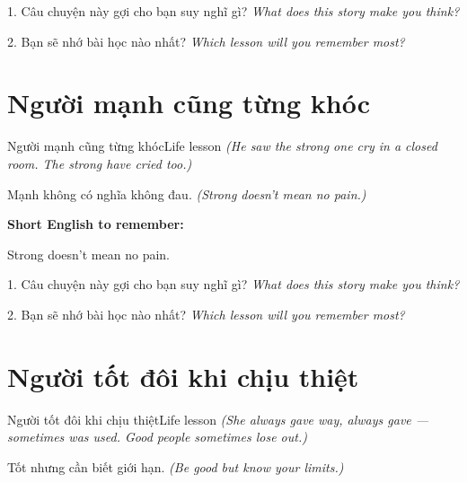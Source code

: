 \begin{tuhocnhanh}
1. Câu chuyện này gợi cho bạn suy nghĩ gì? \textit{What does this story make you think?}

2. Bạn sẽ nhớ bài học nào nhất? \textit{Which lesson will you remember most?}
\end{tuhocnhanh}
\ngancach


\section{Người mạnh cũng từng khóc}
\begin{truyen}{Người mạnh cũng từng khóc}{Life lesson}
\textit{(He saw the strong one cry in a closed room. The strong have cried too.)}
\end{truyen}

\begin{baihoc}
Mạnh không có nghĩa không đau.
\textit{(Strong doesn't mean no pain.)}
\end{baihoc}

\begin{ghinhoanh}
\textbf{Short English to remember:}

Strong doesn't mean no pain.

\end{ghinhoanh}

\begin{tuhocnhanh}
1. Câu chuyện này gợi cho bạn suy nghĩ gì? \textit{What does this story make you think?}

2. Bạn sẽ nhớ bài học nào nhất? \textit{Which lesson will you remember most?}
\end{tuhocnhanh}
\ngancach


\section{Người tốt đôi khi chịu thiệt}
\begin{truyen}{Người tốt đôi khi chịu thiệt}{Life lesson}
\textit{(She always gave way, always gave — sometimes was used. Good people sometimes lose out.)}
\end{truyen}

\begin{baihoc}
Tốt nhưng cần biết giới hạn.
\textit{(Be good but know your limits.)}
\end{baihoc}

